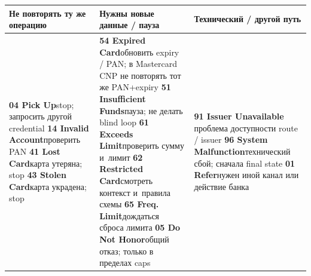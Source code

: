 \begin{table}[H]
  \begingroup
  \scriptsize
  \setlength{\tabcolsep}{4pt}
  \renewcommand{\arraystretch}{1.2}
  \begin{minipage}{\textwidth}
    \begin{tabularx}{\textwidth}{@{}Y Y Y@{}}
      \toprule
      \textbf{Не повторять ту же операцию}
      &
      \textbf{Нужны новые данные / пауза}
      &
      \textbf{Технический / другой путь}
      \\
      \midrule
      \textbf{04 Pick Up}\newline stop; запросить другой credential
      \newline\textbf{14 Invalid Account}\newline проверить PAN
      \newline\textbf{41 Lost Card}\newline карта утеряна; stop
      \newline\textbf{43 Stolen Card}\newline карта украдена; stop
      &
      \textbf{54 Expired Card}\newline обновить expiry
      / PAN; в Mastercard CNP не повторять тот же PAN+expiry
      \newline\textbf{51 Insufficient Funds}\newline пауза; не делать blind loop
      \newline\textbf{61 Exceeds Limit}\newline проверить сумму и~лимит
      \newline\textbf{62 Restricted Card}\newline смотреть контекст и~правила схемы
      \newline\textbf{65 Freq. Limit}\newline дождаться сброса лимита
      \newline\textbf{05 Do Not Honor}\newline общий отказ; только в
      пределах caps &
      \textbf{91 Issuer Unavailable}\newline
      проблема доступности route / issuer
      \newline\textbf{96 System Malfunction}\newline технический сбой;
      сначала final state
      \newline\textbf{01 Refer}\newline нужен иной канал или действие банка

\end{tabularx}
\end{minipage}
\end{table}

